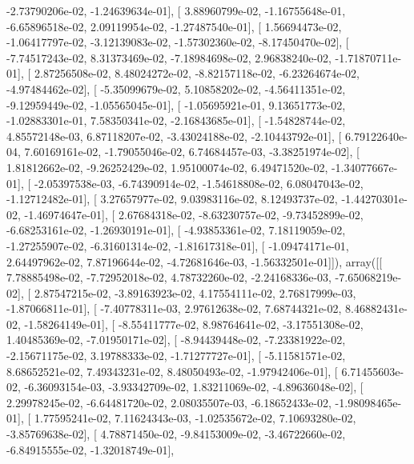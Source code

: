\documentclass{article}
\begin{document}
         -2.73790206e-02,  -1.24639634e-01],
       [  3.88960799e-02,  -1.16755648e-01,  -6.65896518e-02,
          2.09119954e-02,  -1.27487540e-01],
       [  1.56694473e-02,  -1.06417797e-02,  -3.12139083e-02,
         -1.57302360e-02,  -8.17450470e-02],
       [ -7.74517243e-02,   8.31373469e-02,  -7.18984698e-02,
          2.96838240e-02,  -1.71870711e-01],
       [  2.87256508e-02,   8.48024272e-02,  -8.82157118e-02,
         -6.23264674e-02,  -4.97484462e-02],
       [ -5.35099679e-02,   5.10858202e-02,  -4.56411351e-02,
         -9.12959449e-02,  -1.05565045e-01],
       [ -1.05695921e-01,   9.13651773e-02,  -1.02883301e-01,
          7.58350341e-02,  -2.16843685e-01],
       [ -1.54828744e-02,   4.85572148e-03,   6.87118207e-02,
         -3.43024188e-02,  -2.10443792e-01],
       [  6.79122640e-04,   7.60169161e-02,  -1.79055046e-02,
          6.74684457e-03,  -3.38251974e-02],
       [  1.81812662e-02,  -9.26252429e-02,   1.95100074e-02,
          6.49471520e-02,  -1.34077667e-01],
       [ -2.05397538e-03,  -6.74390914e-02,  -1.54618808e-02,
          6.08047043e-02,  -1.12712482e-01],
       [  3.27657977e-02,   9.03983116e-02,   8.12493737e-02,
         -1.44270301e-02,  -1.46974647e-01],
       [  2.67684318e-02,  -8.63230757e-02,  -9.73452899e-02,
         -6.68253161e-02,  -1.26930191e-01],
       [ -4.93853361e-02,   7.18119059e-02,  -1.27255907e-02,
         -6.31601314e-02,  -1.81617318e-01],
       [ -1.09474171e-01,   2.64497962e-02,   7.87196644e-02,
         -4.72681646e-03,  -1.56332501e-01]]), array([[  7.78885498e-02,  -7.72952018e-02,   4.78732260e-02,
         -2.24168336e-03,  -7.65068219e-02],
       [  2.87547215e-02,  -3.89163923e-02,   4.17554111e-02,
          2.76817999e-03,  -1.87066811e-01],
       [ -7.40778311e-03,   2.97612638e-02,   7.68744321e-02,
          8.46882431e-02,  -1.58264149e-01],
       [ -8.55411777e-02,   8.98764641e-02,  -3.17551308e-02,
          1.40485369e-02,  -7.01950171e-02],
       [ -8.94439448e-02,  -7.23381922e-02,  -2.15671175e-02,
          3.19788333e-02,  -1.71277727e-01],
       [ -5.11581571e-02,   8.68652521e-02,   7.49343231e-02,
          8.48050493e-02,  -1.97942406e-01],
       [  6.71455603e-02,  -6.36093154e-03,  -3.93342709e-02,
          1.83211069e-02,  -4.89636048e-02],
       [  2.29978245e-02,  -6.64481720e-02,   2.08035507e-03,
         -6.18652433e-02,  -1.98098465e-01],
       [  1.77595241e-02,   7.11624343e-03,  -1.02535672e-02,
          7.10693280e-02,  -3.85769638e-02],
       [  4.78871450e-02,  -9.84153009e-02,  -3.46722660e-02,
         -6.84915555e-02,  -1.32018749e-01],
\end{document}

